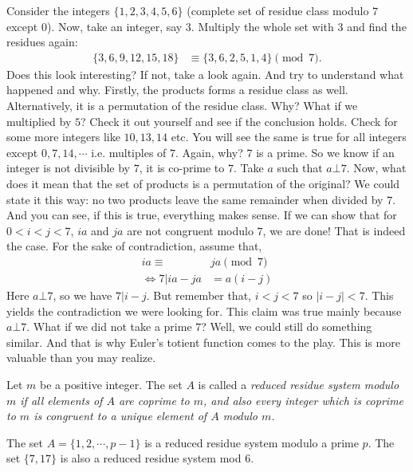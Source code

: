 \documentclass{subfile}
\begin{document}
	Consider the integers $\{1,2,3,4,5,6\}$ (complete set of residue class modulo $7$ except $0$). Now, take an integer, say $3$. Multiply the whole set with $3$ and find the residues again:
		\begin{align*}
			\{3,6,9,12,15,18\} & \equiv\{3,6,2,5,1,4\}\pmod7.
		\end{align*}
	Does this look interesting? If not, take a look again. And try to understand what happened and why. Firstly, the products forms a residue class as well. Alternatively, it is a permutation of the residue class. Why? What if we multiplied by $5$? Check it out yourself and see if the conclusion holds. Check for some more integers like $10, 13,14$ etc. You will see the same is true for all integers except $0,7,14,\cdots$ i.e. multiples of $7$. Again, why? $7$ is a prime. So we know if an integer is not divisible by $7$, it is co-prime to $7$. Take $a$ such that $a\bot7$. Now, what does it mean that the set of products is a permutation of the original? We could state it this way: no two products leave the same remainder when divided by $7$. And you can see, if this is true, everything makes sense. If we can show that for $0<i<j<7$, $ia$ and $ja$ are not congruent modulo $7$, we are done! That is indeed the case. For the sake of contradiction, assume that,
		\begin{align*}
			ia  \equiv &ja\pmod7\\
			\iff 7|ia-ja&=a(i-j)
		\end{align*}
	Here $a\bot7$, so we have $7|i-j$. But remember that, $i<j<7$ so $|i-j|<7$. This yields the contradiction we were looking for. This claim was true mainly because $a\bot7$. What if we did not take a prime $7$? Well, we could still do something similar. And that is why Euler's totient function comes to the play. This is more valuable than you may realize.
	
	\begin{definition}
		Let $m$ be a positive integer. The set $A$ is called a \slshape{reduced residue system modulo $m$} if all elements of $A$ are coprime to $m$, and also every integer which is coprime to $m$ is congruent to a unique element of $A$ modulo $m$.
	\end{definition}
	
	\begin{example}
		The set $A=\{ 1, 2, \cdots, p-1 \}$ is a reduced residue system modulo a prime $p$. The set $\{7, 17\}$ is also a reduced residue system mod $6$.
	\end{example}
	
\end{document}
